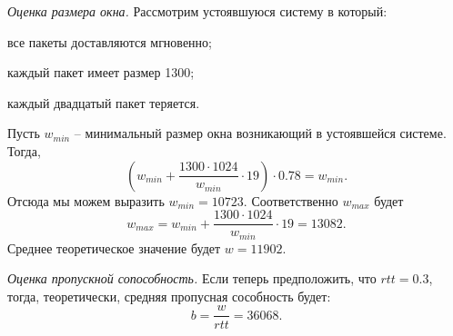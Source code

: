 \documentclass[draft]{article}
\begin{document}
{\em Оценка размера окна.}
Рассмотрим устоявшуюся систему в который:
\begin{itemize}
  {\item все пакеты доставляются мгновенно;}
  {\item каждый пакет имеет размер 1300;}
  {\item каждый двадцатый пакет теряется.}
\end{itemize}

Пусть $w_{min}$ -- минимальный размер окна возникающий в устоявшейся системе. Тогда,
\[ (w_{min} + \frac{1300 \cdot 1024}{w_{min}} \cdot 19) \cdot 0.78 = w_{min}. \]
Отсюда мы можем выразить $w_{min} = 10723.$ Соответственно $w_{max}$ будет
\[ w_{max} = w_{min} + \frac{1300 \cdot 1024}{w_{min}} \cdot 19 = 13082. \]
Среднее теоретическое значение будет $w = 11902.$

{\em Оценка пропускной сопособность.} Если теперь предположить, что $rtt = 0.3$, тогда, теоретически, средняя пропусная сособность будет:
\[ b = \frac{w}{rtt} = 36068. \]
\end{document}
